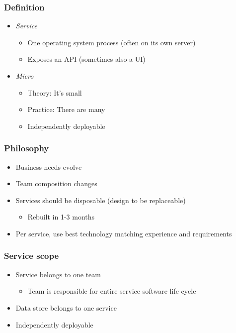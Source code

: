 \documentclass[8pt]{article}
\begin{document}
\subsubsection{Definition}
\label{sec:orgf915450}
\begin{itemize}
\item \emph{Service}
\begin{itemize}
\item One operating system process (often on its own server)
\item Exposes an API (sometimes also a UI)
\end{itemize}
\item \emph{Micro}
\begin{itemize}
\item Theory: It's small
\item Practice: There are many
\item Independently deployable
\end{itemize}
\end{itemize}
\subsubsection{Philosophy}
\label{sec:org3ef021f}
\begin{itemize}
\item Business needs evolve
\item Team composition changes
\item Services should be disposable (design to be replaceable)
\begin{itemize}
\item Rebuilt in 1-3 months
\end{itemize}
\item Per service, use best technology matching experience and requirements
\end{itemize}
\subsubsection{Service scope}
\label{sec:orgf961cd3}
\begin{itemize}
\item Service belongs to one team
\begin{itemize}
\item Team is responsible for entire service software life cycle
\end{itemize}
\item Data store belongs to one service
\item Independently deployable
\end{itemize}
\end{document}
